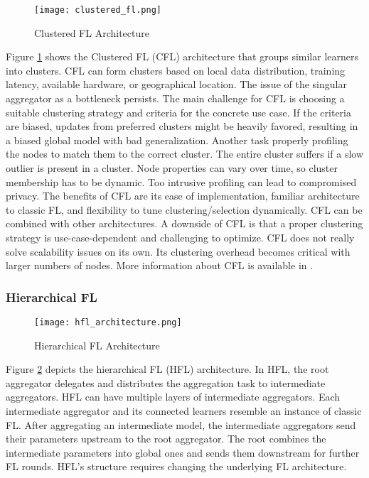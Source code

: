 \begin{figure}[h]
    \centering
    \texttt{[image: clustered\_fl.png]}
    \caption{Clustered FL Architecture}
    \label{fig:clustered_fl}
\end{figure}
Figure \ref{fig:clustered_fl} shows the Clustered FL (CFL) architecture that groups similar learners into clusters.
CFL can form clusters based on local data distribution, training latency, available hardware, or geographical location.
The issue of the singular aggregator as a bottleneck persists.
The main challenge for CFL is choosing a suitable clustering strategy and criteria for the concrete use case.
If the criteria are biased, updates from preferred clusters might be heavily favored, resulting in a biased global model with bad generalization.
Another task properly profiling the nodes to match them to the correct cluster.
The entire cluster suffers if a slow outlier is present in a cluster.
Node properties can vary over time, so cluster membership has to be dynamic.
Too intrusive profiling can lead to compromised privacy.
The benefits of CFL are its ease of implementation, familiar architecture to classic FL, and flexibility to tune clustering/selection dynamically.
CFL can be combined with other architectures.
A downside of CFL is that a proper clustering strategy is use-case-dependent and challenging to optimize.
CFL does not really solve scalability issues on its own.
Its clustering overhead becomes critical with larger numbers of nodes.
More information about CFL is available in \cite{
    paper:cluster_based_secure_aggregation_for_fl,
    paper:fedat_high_performance_communication_efficient_fl_with_asynch_tiers,
    book:fl,paper:decentralized_edge_intelligence_dynamic_resource_allocation_framework_hfl}.

\subsubsection{Hierarchical FL}
\begin{figure}[h]
    \centering
    \texttt{[image: hfl\_architecture.png]}
    \caption{Hierarchical FL Architecture}
    \label{fig:hfl_architecture}
\end{figure}
Figure \ref{fig:hfl_architecture} depicts the hierarchical FL (HFL) architecture.
In HFL, the root aggregator delegates and distributes the aggregation task to intermediate aggregators.
HFL can have multiple layers of intermediate aggregators.
Each intermediate aggregator and its connected learners resemble an instance of classic FL.
After aggregating an intermediate model, the intermediate aggregators send their parameters upstream to the root aggregator.
The root combines the intermediate parameters into global ones and sends them downstream for further FL rounds.
HFL's structure requires changing the underlying FL architecture.

